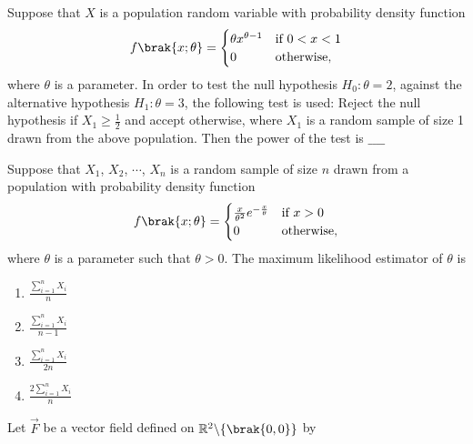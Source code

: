 \iffalse
\chapter{2014}
\author{AI24BTECH11009}
\section{ma}
\fi

\item Suppose that $X$ is a population random variable with probability density function
\begin{align*}
    f\brak{x; \theta} = \begin{cases}
        \theta x^{\theta-1} & \text{if}\ 0 < x < 1 \\
        0 & \text{otherwise},
    \end{cases}
\end{align*}
where $\theta$ is a parameter. In order to test the null hypothesis $H_0: \theta = 2$, against the alternative hypothesis $H_1: \theta = 3$, the following test is used: Reject the null hypothesis if $X_1 \geq \frac{1}{2}$ and accept otherwise, where $X_1$ is a random sample of size 1 drawn from the above population. Then the power of the test is $\_\_\_\_$ \\
\item Suppose that $X_1$, $X_2$, $\cdots$, $X_n$ is a random sample of size $n$ drawn from a population with probability density function 
\begin{align*}
    f\brak{x; \theta} = \begin{cases}
        \frac{x}{\theta^2}e^{-\frac{x}{\theta}} & \text{if}\ x > 0 \\
        0 & \text{otherwise},
    \end{cases}
\end{align*}
where $\theta$ is a parameter such that $\theta > 0$. The maximum likelihood estimator of $\theta$ is
\begin{enumerate}
    \item $\frac{\sum\limits_{i=1}^{n}X_i}{n}$
    \item $\frac{\sum\limits_{i=1}^{n}X_i}{n-1}$
    \item $\frac{\sum\limits_{i=1}^{n}X_i}{2n}$
    \item $\frac{2\sum\limits_{i=1}^{n}X_i}{n}$ \\
\end{enumerate}
\item Let $\overrightarrow{F}$ be a vector field defined on $\mathbb{R}^2\backslash\{\brak{0,0}\}$ by 
